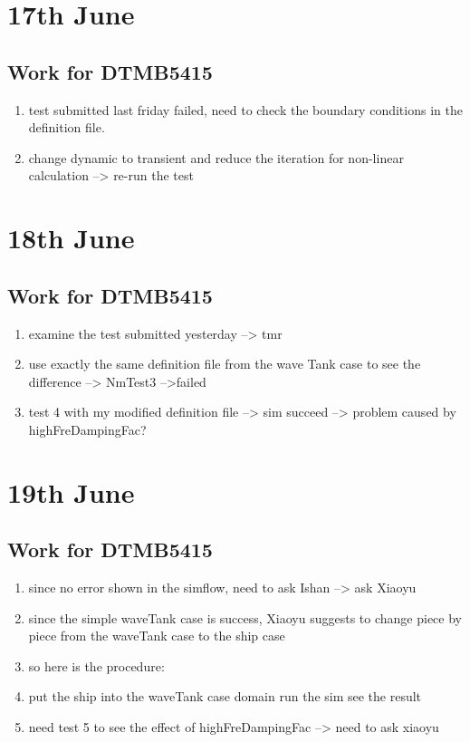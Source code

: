 \documentclass[12pt]{article} %
\begin{document}
\section{17th June}
\subsection{Work for DTMB5415}
\begin{enumerate}
    \item test submitted last friday failed, need to check the boundary conditions in the definition file.
    \item change dynamic to transient and reduce the iteration for non-linear calculation --> re-run the test
\end{enumerate}
\section{18th June}
\subsection{Work for DTMB5415}
\begin{enumerate}
    \item examine the test submitted yesterday --> tmr
    \item use exactly the same definition file from the wave Tank case to see the difference --> NmTest3 -->failed
    \item test 4 with my modified definition file --> sim succeed --> problem caused by highFreDampingFac?
\end{enumerate}
\section{19th June}
\subsection{Work for DTMB5415}
\begin{enumerate}
    \item since no error shown in the simflow, need to ask Ishan --> ask Xiaoyu
    \item since the simple waveTank case is success, Xiaoyu suggests to change piece by piece from the waveTank case to the ship case
    \item so here is the procedure:
    \item put the ship into the waveTank case domain run the sim see the result
    \item need test 5 to see the effect of highFreDampingFac --> need to ask xiaoyu
\end{enumerate}
\end{document}
